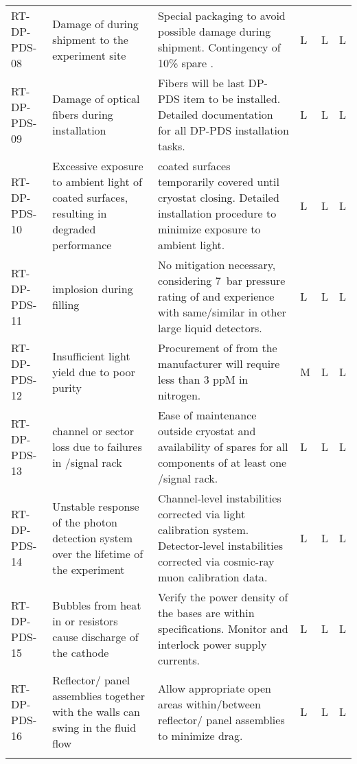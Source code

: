 \begin{footnotesize}
\begin{longtable}{P{0.18\textwidth}P{0.20\textwidth}P{0.32\textwidth}P{0.02\textwidth}P{0.02\textwidth}P{0.02\textwidth}}
RT-DP-PDS-08 & Damage of  during shipment to the experiment site & Special packaging to avoid possible  damage during shipment. Contingency of 10\% spare  . & L & L & L \\  \colhline
RT-DP-PDS-09 & Damage of optical fibers during installation & Fibers will be last DP-PDS item to be installed. Detailed documentation for all DP-PDS installation tasks.   & L & L & L \\  \colhline
RT-DP-PDS-10 & Excessive exposure to ambient light of  coated surfaces, resulting in degraded performance &  coated surfaces temporarily covered until cryostat closing. Detailed installation procedure to minimize exposure to ambient light. & L & L & L \\  \colhline
RT-DP-PDS-11 &  implosion during  filling & No mitigation necessary, considering \SI{7}{bar} pressure rating of  and experience with same/similar  in other large liquid detectors. & L & L & L \\  \colhline
RT-DP-PDS-12 & Insufficient light yield due to poor  purity & Procurement of  from the manufacturer will require less than 3 ppM in nitrogen. & M & L & L \\  \colhline
RT-DP-PDS-13 &  channel or  sector loss due to failures in /signal rack & Ease of maintenance outside cryostat and availability of spares for all components of at least one /signal rack. & L & L & L \\  \colhline
RT-DP-PDS-14 & Unstable response of the photon detection system over the lifetime of the experiment & Channel-level instabilities corrected via light calibration system. Detector-level instabilities corrected via cosmic-ray muon calibration data. & L & L & L \\  \colhline
RT-DP-PDS-15 & Bubbles from heat in  or resistors cause  discharge of the cathode & Verify the power density of the  bases are within specifications. Monitor and interlock  power supply currents. & L & L & L \\  \colhline
RT-DP-PDS-16 & Reflector/ panel assemblies together with the  walls can swing in the fluid flow & Allow appropriate open areas within/between reflector/ panel assemblies to minimize drag. & L & L & L \\  \colhline

\label{tab:risks:DP-FD-PDS}
\end{longtable}
\end{footnotesize}
